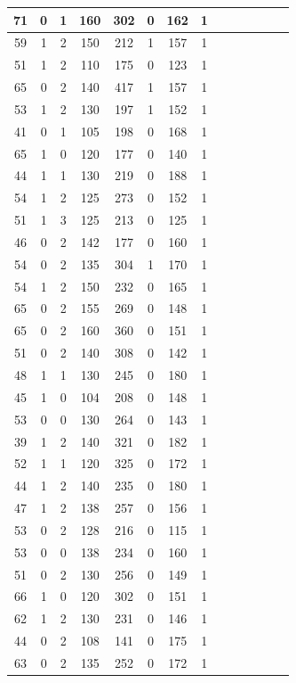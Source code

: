 \documentclass{article}
\begin{document}
\begin{center}
\begin{longtable}{|c|c|c|c|c|c|c|c|c|c|c|c|c|c|}
\hline
71 & 0 & 1 & 160 & 302 & 0 & 162 & 1 \\
\hline
59 & 1 & 2 & 150 & 212 & 1 & 157 & 1 \\
\hline
51 & 1 & 2 & 110 & 175 & 0 & 123 & 1 \\
\hline
65 & 0 & 2 & 140 & 417 & 1 & 157 & 1 \\
\hline
53 & 1 & 2 & 130 & 197 & 1 & 152 & 1 \\
\hline
41 & 0 & 1 & 105 & 198 & 0 & 168 & 1 \\
\hline
65 & 1 & 0 & 120 & 177 & 0 & 140 & 1 \\
\hline
44 & 1 & 1 & 130 & 219 & 0 & 188 & 1 \\
\hline
54 & 1 & 2 & 125 & 273 & 0 & 152 & 1 \\
\hline
51 & 1 & 3 & 125 & 213 & 0 & 125 & 1 \\
\hline
46 & 0 & 2 & 142 & 177 & 0 & 160 & 1 \\
\hline
54 & 0 & 2 & 135 & 304 & 1 & 170 & 1 \\
\hline
54 & 1 & 2 & 150 & 232 & 0 & 165 & 1 \\
\hline
65 & 0 & 2 & 155 & 269 & 0 & 148 & 1 \\
\hline
65 & 0 & 2 & 160 & 360 & 0 & 151 & 1 \\
\hline
51 & 0 & 2 & 140 & 308 & 0 & 142 & 1 \\
\hline
48 & 1 & 1 & 130 & 245 & 0 & 180 & 1 \\
\hline
45 & 1 & 0 & 104 & 208 & 0 & 148 & 1 \\
\hline
53 & 0 & 0 & 130 & 264 & 0 & 143 & 1 \\
\hline
39 & 1 & 2 & 140 & 321 & 0 & 182 & 1 \\
\hline
52 & 1 & 1 & 120 & 325 & 0 & 172 & 1 \\
\hline
44 & 1 & 2 & 140 & 235 & 0 & 180 & 1 \\
\hline
47 & 1 & 2 & 138 & 257 & 0 & 156 & 1 \\
\hline
53 & 0 & 2 & 128 & 216 & 0 & 115 & 1 \\
\hline
53 & 0 & 0 & 138 & 234 & 0 & 160 & 1 \\
\hline
51 & 0 & 2 & 130 & 256 & 0 & 149 & 1 \\
\hline
66 & 1 & 0 & 120 & 302 & 0 & 151 & 1 \\
\hline
62 & 1 & 2 & 130 & 231 & 0 & 146 & 1 \\
\hline
44 & 0 & 2 & 108 & 141 & 0 & 175 & 1 \\
\hline
63 & 0 & 2 & 135 & 252 & 0 & 172 & 1 \\

\end{longtable}
\end{center}
\end{document}
